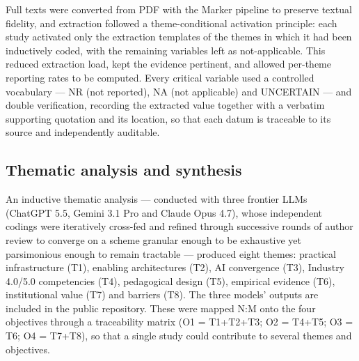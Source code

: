 Full texts were converted from PDF with the Marker pipeline to preserve textual
fidelity, and extraction followed a theme-conditional activation principle: each
study activated only the extraction templates of the themes in which it had been
inductively coded, with the remaining variables left as not-applicable. This
reduced extraction load, kept the evidence pertinent, and allowed per-theme
reporting rates to be computed. Every critical variable used a controlled
vocabulary --- NR (not reported), NA (not applicable) and UNCERTAIN --- and double
verification, recording the extracted value together with a verbatim supporting
quotation and its location, so that each datum is traceable to its source and
independently auditable.

\subsection{Thematic analysis and synthesis}\label{thematic-analysis-and-synthesis}

An inductive thematic analysis --- conducted with three frontier LLMs (ChatGPT 5.5,
Gemini 3.1 Pro and Claude Opus 4.7), whose independent codings were iteratively
cross-fed and refined through successive rounds of author review to converge on a
scheme granular enough to be exhaustive yet parsimonious enough to remain
tractable --- produced eight themes: practical infrastructure (T1), enabling
architectures (T2), AI convergence (T3), Industry 4.0/5.0 competencies (T4),
pedagogical design (T5), empirical evidence (T6), institutional value (T7) and
barriers (T8). The three models' outputs are included in the public repository. These were mapped N:M onto the four objectives
through a traceability matrix (O1 = T1+T2+T3; O2 = T4+T5; O3 = T6; O4 = T7+T8), so
that a single study could contribute to several themes and objectives.

